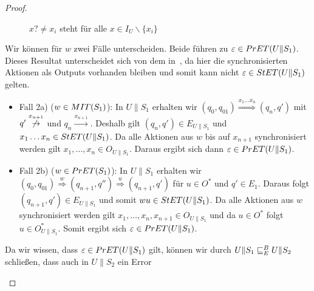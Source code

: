 \begin{proof}
\begin{itemize}
\begin{figure} [h!tbp]
\begin{center}
        \caption{$x?\neq x_i$ steht für alle $x\in I_U\backslash\{x_i\}$}
        \label{UohneE}
      \end{center}
      \end{figure}
      Wir können für $w$ zwei Fälle unterscheiden. Beide führen zu
      $\varepsilon\in PrET{}(U\|S_1)$. Dieses Resultat unterscheidet sich von dem
      in~\cite{Vogler2014EIO}, da hier die synchronisierten Aktionen als Outputs
      vorhanden bleiben und somit kann nicht $\varepsilon\in StET{}(U\|S_1)$
      gelten.
      \begin{itemize}
        \item Fall 2a) ($w\in MIT{}(S_1)$): In $U\|S_1$ erhalten wir
          $(q_0,q_{01}) \overset{x_1\dots x_n}{\Rightarrow} (q_n,q')$ mit
          $q' \overset{x_{n+1}}{\not{\hspace{-0.1cm}\rightarrow}}$ und $q_n
          \overset{x_{n+1}}{\rightarrow}$. Deshalb gilt $(q_n,q')\in
          E_{U\|S_1}$ und $x_1\dots x_n\in StET{}(U\|S_1)$. Da alle Aktionen aus
          $w$ bis auf $x_{n+1}$ synchronisiert werden gilt $x_1,\dots ,x_n\in
          O_{U\|S_1}$. Daraus ergibt sich dann $\varepsilon\in PrET{}(U\|S_1)$.
        \item Fall 2b) ($w\in PrET{}(S_1)$): In $U\|S_1$ erhalten wir
          $(q_0,q_{01}) \overset{w}{\Rightarrow} (q_{n+1},q'')
          \overset{u}{\Rightarrow} (q_{n+1},q')$ für $u\in O^*$ und $q'\in
          E_1$. Daraus folgt $(q_{n+1},q')\in E_{U\|S_1}$ und somit $wu\in
          StET{}(U\|S_1)$. Da alle Aktionen aus $w$ synchronisiert werden gilt
          $x_1,\dots ,x_n,x_{n+1}\in O_{U\|S_1}$ und da $u\in O^*$ folgt
          $u\in O_{U\|S_1}^*$. Somit ergibt sich $\varepsilon\in
          PrET{}(U\|S_1)$.
      \end{itemize}
      Da wir wissen, dass $\varepsilon\in PrET{}(U\|S_1)$ gilt, können wir durch
      $U\|S_1\sqsubseteq _E^B U\|S_2$ schließen, dass auch in $U\|S_2$ ein Error

\end{itemize}
\end{proof}
